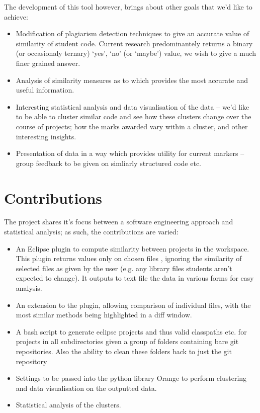 The development of this tool however, brings about other goals that we'd like to
achieve:
\begin{itemize}

\item Modification of plagiarism detection techniques to give an accurate value
of similarity of student code. Current research predominantely returns a binary
(or occasionaly ternary) `yes', `no' (or `maybe') value, we wish to give a much
finer grained answer.

\item Analysis of similarity measures as to which provides the most accurate
and useful information.

\item Interesting statistical analysis and data visualisation of the data -- 
we'd like to be able to cluster similar code and see how these clusters change
over the course of projects; how the marks awarded vary within a cluster, and
other interesting insights. 

\item Presentation of data in a way which provides utility for current markers
-- group feedback to be given on simliarly structured code etc.

\end{itemize}

\section{Contributions}

The project shares it's focus between a software engineering approach and statistical
analysis; as such, the contributions are varied:

\begin{itemize}

\item An Eclipse plugin to compute similarity between projects in the workspace.
This plugin returns values only on chosen files , ignoring the
similarity of selected files as given by the user (e.g. any library files students
aren't expected to change). It outputs to text file the data in various forms
for easy analysis.

\item An extension to the plugin, allowing comparison of individual files,
with the most similar methods being highlighted in a diff window.

\item A bash script to generate eclipse projects and thus valid classpaths etc.
for projects in all subdirectories given a group of folders containing bare git
repositories. Also the ability to clean these folders back to just the git
repository

\item Settings to be passed into the python library Orange to perform clustering
and data visualisation on the outputted data.

\item Statistical analysis of the clusters.

\end{itemize}


